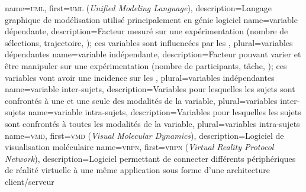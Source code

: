 %
{%
	name={\textsc{uml}},%
	first={\textsc{uml} (\textit{Unified Modeling Language})},%
	description={Langage graphique de modélisation utilisé principalement en génie logiciel}%
}
%
{%
	name={variable dépendante},%
	description={Facteur mesuré sur une expérimentation (nombre de sélections, trajectoire, \myetc); ces variables sont influencées par les },%
	plural={variables dépendantes}%
}
%
{%
	name={variable indépendante},%
	description={Facteur pouvant varier et être manipuler sur une expérimentation (nombre de participants, tâche, \myetc); ces variables vont avoir une incidence sur les },%
	plural={variables indépendantes}%
}
%
{%
	name={variable inter-sujets},%
	description={Variables pour lesquelles les sujets sont confrontés à une et une seule des modalités de la variable},%
	plural={variables inter-sujets}%
}
%
{%
	name={variable intra-sujets},%
	description={Variables pour lesquelles les sujets sont confrontés à toutes les modalités de la variable},%
	plural={variables intra-sujets}%
}
%
{%
	name={\textsc{vmd}},%
	first={\textsc{vmd} (\textit{Visual Molecular Dynamics})},%
	description={Logiciel de visualisation moléculaire }%
}
%
{%
	name={\textsc{vrpn}},%
	first={\textsc{vrpn} (\textit{Virtual Reality Protocol Network})},%
	description={Logiciel permettant de connecter différents périphériques de réalité virtuelle à une même application sous forme d'une architecture client/serveur }%
}
